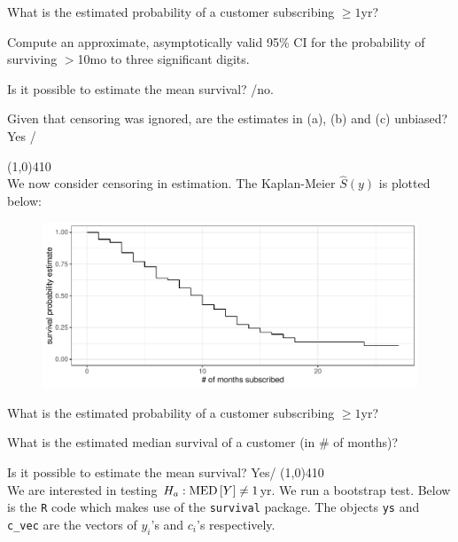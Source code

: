 \documentclass[12pt]{article}
\begin{document}
\begin{enumerate}[(a)]

 What is the estimated probability of a customer subscribing $\geq 1$yr?\\


 Compute an approximate, asymptotically valid 95\% CI for the probability of surviving $>$10mo to three significant digits.\\


 Is it possible to estimate the mean survival? /no.

 Given that censoring was ignored, are the estimates in (a), (b) and (c) unbiased? Yes /

 \line(1,0){410} \\
We now consider censoring in estimation. The Kaplan-Meier $\hat{S}(y)$ is plotted below:

\begin{figure}[htp]
\centering
\includegraphics[width=4.6in]{survival_with_censoring}
\end{figure}

 What is the estimated probability of a customer subscribing $\geq 1$yr?\\


 What is the estimated median survival of a customer (in \# of months)?\\


 Is it possible to estimate the mean survival? Yes/
 \line(1,0){410} \\
We are interested in testing $H_a: \text{MED}\left[Y\right] \neq 1$yr. We run a bootstrap test. Below is the \texttt{R} code which makes use of the \texttt{survival} package. The objects \texttt{ys} and \texttt{c\_vec} are the vectors of $y_i$'s and $c_i$'s respectively.


\end{enumerate}
\end{document}
